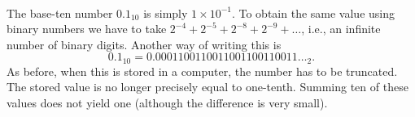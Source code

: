 \\
The base-ten number $0.1_{10}$ is simply $1\times 10^{-1}$.  To
obtain the same value using binary numbers we have to take
$2^{-4}+2^{-5}+2^{-8}+2^{-9}+\ldots$, i.e., an infinite number of
binary digits.  Another way of writing this is
\[
0.1_{10} = 0.0001100110011001100110011\ldots_{2}.
\]
As before, when this is stored in a computer, the number has to be
truncated.  The stored value is no longer precisely equal to
one-tenth.  Summing ten of these values does not yield one (although
the difference is very small).

